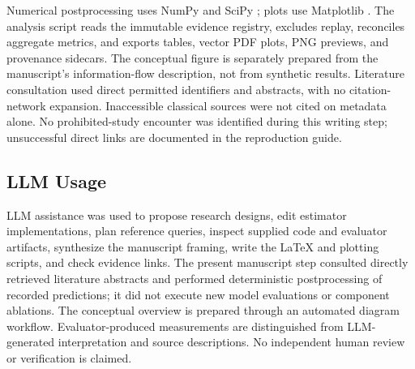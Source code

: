 \documentclass{article}
\begin{document}
Numerical postprocessing uses NumPy \citep{Harris2020} and SciPy \citep{Virtanen2020}; plots use Matplotlib \citep{Hunter2007}. The analysis script reads the immutable evidence registry, excludes replay, reconciles aggregate metrics, and exports tables, vector PDF plots, PNG previews, and provenance sidecars. The conceptual figure is separately prepared from the manuscript's information-flow description, not from synthetic results. Literature consultation used direct permitted identifiers and abstracts, with no citation-network expansion. Inaccessible classical sources were not cited on metadata alone. No prohibited-study encounter was identified during this writing step; unsuccessful direct links are documented in the reproduction guide.

\subsection{LLM Usage}
LLM assistance was used to propose research designs, edit estimator implementations, plan reference queries, inspect supplied code and evaluator artifacts, synthesize the manuscript framing, write the LaTeX and plotting scripts, and check evidence links. The present manuscript step consulted directly retrieved literature abstracts and performed deterministic postprocessing of recorded predictions; it did not execute new model evaluations or component ablations. The conceptual overview is prepared through an automated diagram workflow. Evaluator-produced measurements are distinguished from LLM-generated interpretation and source descriptions. No independent human review or verification is claimed.
\end{document}
